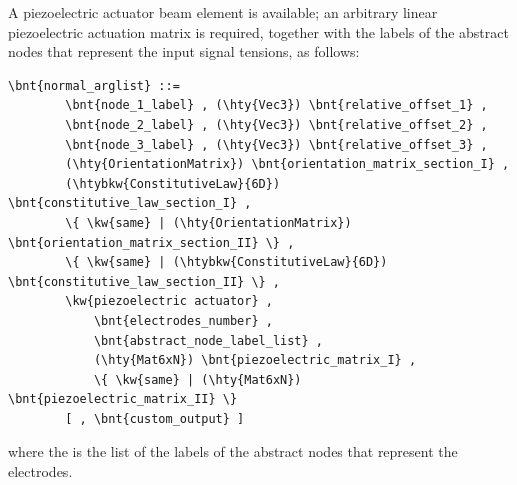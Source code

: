 A piezoelectric actuator beam element is available; an arbitrary
linear piezoelectric actuation matrix is required, together with the labels
of the abstract nodes that represent the input signal tensions, as follows:
\begin{Verbatim}[commandchars=\\\{\}]
    \bnt{normal_arglist} ::=
        \bnt{node_1_label} , (\hty{Vec3}) \bnt{relative_offset_1} ,
        \bnt{node_2_label} , (\hty{Vec3}) \bnt{relative_offset_2} ,
        \bnt{node_3_label} , (\hty{Vec3}) \bnt{relative_offset_3} ,
        (\hty{OrientationMatrix}) \bnt{orientation_matrix_section_I} ,
        (\htybkw{ConstitutiveLaw}{6D}) \bnt{constitutive_law_section_I} ,
        \{ \kw{same} | (\hty{OrientationMatrix}) \bnt{orientation_matrix_section_II} \} ,
        \{ \kw{same} | (\htybkw{ConstitutiveLaw}{6D}) \bnt{constitutive_law_section_II} \} ,
        \kw{piezoelectric actuator} , 
            \bnt{electrodes_number} ,
            \bnt{abstract_node_label_list} ,
            (\hty{Mat6xN}) \bnt{piezoelectric_matrix_I} ,
            \{ \kw{same} | (\hty{Mat6xN}) \bnt{piezoelectric_matrix_II} \}
        [ , \bnt{custom_output} ]
\end{Verbatim}
where the  is the list of the labels of the
abstract nodes that represent the electrodes.

